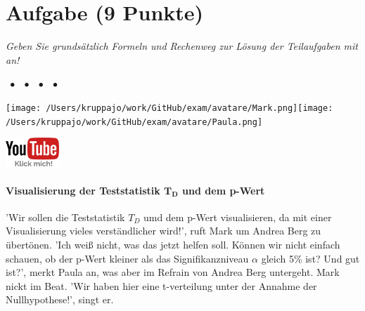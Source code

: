 \documentclass[a4paper, 9pt]{scrartcl}\usepackage[]{graphicx}\usepackage[]{xcolor}
\begin{document}
 
\clearpage

\section{Aufgabe \hfill (9 Punkte)}

\textit{Geben Sie grundsätzlich Formeln und Rechenweg zur Lösung der Teilaufgaben mit an!} \\[1Ex]


 
\ifcollection
\begin{flushright}
\tiny\vspace{-3Ex}
\textbf{\examinhaltstart}
\exammodulemathstat $\;\bullet$
\exammodulestat $\;\bullet$
\exammodulestatbbv $\;\bullet$
\exammodulestatversuch $\;\bullet$
\exammodulebiostat
\vspace{-4Ex}
\end{flushright}
\begin{minipage}[t]{0.5\textwidth}
\texttt{[image: /Users/kruppajo/work/GitHub/exam/avatare/Mark.png]}\hspace{-4mm}\texttt{[image: /Users/kruppajo/work/GitHub/exam/avatare/Paula.png]}
\end{minipage}
\begin{minipage}[t]{0.5\textwidth}
\hfill
\href{https://youtu.be/32JjH1eyuTU}{\includegraphics[width = 2cm]{img/youtube}}
\end{minipage}
\fi



\ifcollection
\paragraph{Visualisierung der Teststatistik $\boldsymbol{T_D}$ und dem p-Wert}
\fi

'Wir sollen die Teststatistik $T_D$ umd dem p-Wert visualisieren, da mit einer Visualisierung vieles verständlicher wird!', ruft Mark um Andrea Berg zu übertönen. 'Ich weiß nicht, was das jetzt helfen soll. Können wir nicht einfach schauen, ob der p-Wert kleiner als das Signifikanzniveau  $\alpha$ gleich 5\% ist? Und gut ist?', merkt Paula an, was aber im Refrain von Andrea Berg untergeht. Mark nickt im Beat. 'Wir haben hier eine t-verteilung unter der Annahme der Nullhypothese!', singt er.
\end{document}
